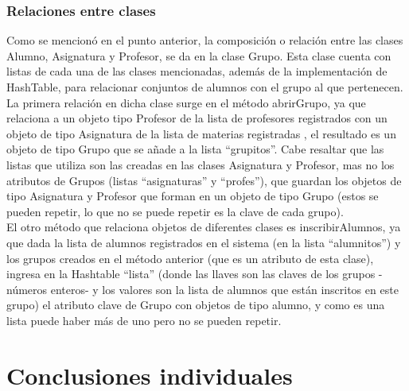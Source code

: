 \documentclass[12pt]{report}
\begin{document}
\begin{itemize}
\subsubsection{Relaciones entre clases}
Como se mencionó en el punto anterior, la composición o relación entre las clases Alumno, Asignatura y Profesor, se da en la clase Grupo. Esta clase cuenta con listas de cada una de las clases mencionadas, además de la implementación de HashTable, para relacionar conjuntos de alumnos con el grupo al que pertenecen.\\
La primera relación en dicha clase surge en el método abrirGrupo, ya que relaciona a un objeto tipo Profesor de la lista de profesores registrados con un objeto de tipo Asignatura de la lista de materias registradas , el resultado es un objeto de tipo Grupo que se añade a la lista “grupitos”. Cabe resaltar que las listas que utiliza son las creadas en las clases Asignatura y Profesor, mas no los atributos de Grupos (listas “asignaturas” y “profes”), que guardan los objetos de tipo Asignatura y Profesor que forman en un objeto de tipo Grupo (estos se pueden repetir, lo que no se puede repetir es la clave de cada grupo).\\
El otro método que relaciona objetos de diferentes clases es inscribirAlumnos, ya que dada la lista de alumnos registrados en el sistema (en la lista “alumnitos”) y los grupos creados en el método anterior (que es un atributo de esta clase), ingresa en la Hashtable “lista” (donde las llaves son las claves de los grupos -números enteros- y los valores son la lista de alumnos que están inscritos en este grupo) el atributo clave de Grupo con objetos de tipo alumno, y como es una lista puede haber más de uno pero no se pueden repetir.\\



\end{itemize}

\newpage
\section*{Conclusiones individuales}
\end{document}
